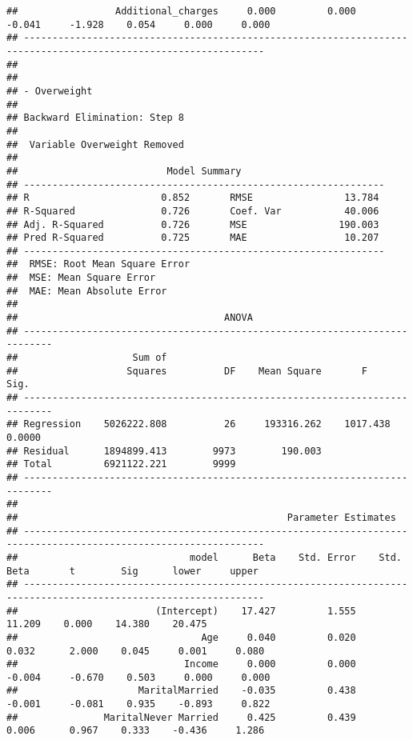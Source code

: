\documentclass[
]{article}
\begin{document}
\begin{verbatim}
##                 Additional_charges     0.000         0.000       -0.041     -1.928    0.054     0.000     0.000 
## ----------------------------------------------------------------------------------------------------------------
## 
## 
## - Overweight 
## 
## Backward Elimination: Step 8 
## 
##  Variable Overweight Removed 
## 
##                          Model Summary                          
## ---------------------------------------------------------------
## R                       0.852       RMSE                13.784 
## R-Squared               0.726       Coef. Var           40.006 
## Adj. R-Squared          0.726       MSE                190.003 
## Pred R-Squared          0.725       MAE                 10.207 
## ---------------------------------------------------------------
##  RMSE: Root Mean Square Error 
##  MSE: Mean Square Error 
##  MAE: Mean Absolute Error 
## 
##                                    ANOVA                                    
## ---------------------------------------------------------------------------
##                    Sum of                                                  
##                   Squares          DF    Mean Square       F          Sig. 
## ---------------------------------------------------------------------------
## Regression    5026222.808          26     193316.262    1017.438    0.0000 
## Residual      1894899.413        9973        190.003                       
## Total         6921122.221        9999                                      
## ---------------------------------------------------------------------------
## 
##                                               Parameter Estimates                                                
## ----------------------------------------------------------------------------------------------------------------
##                              model      Beta    Std. Error    Std. Beta       t        Sig      lower     upper 
## ----------------------------------------------------------------------------------------------------------------
##                        (Intercept)    17.427         1.555                  11.209    0.000    14.380    20.475 
##                                Age     0.040         0.020        0.032      2.000    0.045     0.001     0.080 
##                             Income     0.000         0.000       -0.004     -0.670    0.503     0.000     0.000 
##                     MaritalMarried    -0.035         0.438       -0.001     -0.081    0.935    -0.893     0.822 
##               MaritalNever Married     0.425         0.439        0.006      0.967    0.333    -0.436     1.286 

\end{verbatim}
\end{document}
